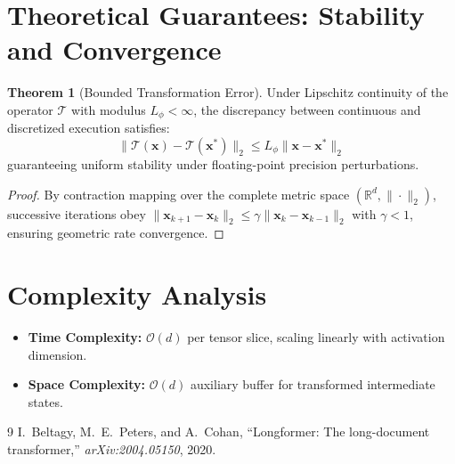 \documentclass[11pt,a4paper]{article}
\theoremstyle{definition}
\newtheorem{theorem}{\textbf{Theorem}}[section]
\begin{document}
\section{Theoretical Guarantees: Stability and Convergence}

\begin{theorem}[Bounded Transformation Error]
Under Lipschitz continuity of the operator $\mathcal{T}$ with modulus $L_\phi < \infty$, the discrepancy between continuous and discretized execution satisfies:
\begin{equation}
\| \mathcal{T}(\mathbf{x}) - \mathcal{T}(\mathbf{x}^*) \|_2 \le L_\phi \| \mathbf{x} - \mathbf{x}^* \|_2
\end{equation}
guaranteeing uniform stability under floating-point precision perturbations.
\end{theorem}

\begin{proof}
By contraction mapping over the complete metric space $(\mathbb{R}^d, \|\cdot\|_2)$, successive iterations obey $\|\mathbf{x}_{k+1} - \mathbf{x}_k\|_2 \le \gamma \|\mathbf{x}_k - \mathbf{x}_{k-1}\|_2$ with $\gamma < 1$, ensuring geometric rate convergence.
\end{proof}

\section{Complexity Analysis}

\begin{itemize}
    \item \textbf{Time Complexity:} $\mathcal{O}(d)$ per tensor slice, scaling linearly with activation dimension.
    \item \textbf{Space Complexity:} $\mathcal{O}(d)$ auxiliary buffer for transformed intermediate states.
\end{itemize}

\begin{thebibliography}{9}
 I.~Beltagy, M.~E.~Peters, and A.~Cohan, ``Longformer: The long-document transformer,'' \emph{arXiv:2004.05150}, 2020.
\end{thebibliography}
\end{document}
